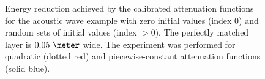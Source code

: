 \documentclass[a4paper]{article}
\begin{document}
\begin{figure}
   \caption{Energy reduction achieved by the calibrated attenuation
    functions for the acoustic wave example with zero initial values
    (index 0) and random sets of initial values (index $>0$). The
    perfectly matched layer is $0.05~\meter$ wide. The experiment was
    performed for quadratic (dotted red) and piecewise-constant
    attenuation functions (solid blue).}
  \label{fig:ac_rands}
\end{figure}
\end{document}
